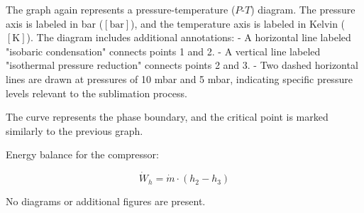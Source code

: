 The graph again represents a pressure-temperature (\(P\)-\(T\)) diagram. The pressure axis is labeled in bar (\([ \text{bar} ]\)), and the temperature axis is labeled in Kelvin (\([ \text{K} ]\)). The diagram includes additional annotations:  
- A horizontal line labeled "isobaric condensation" connects points 1 and 2.  
- A vertical line labeled "isothermal pressure reduction" connects points 2 and 3.  
- Two dashed horizontal lines are drawn at pressures of 10 mbar and 5 mbar, indicating specific pressure levels relevant to the sublimation process.  

The curve represents the phase boundary, and the critical point is marked similarly to the previous graph.

Energy balance for the compressor:  

\[
\dot{W}_h = \dot{m} \cdot (h_2 - h_3)
\]  

No diagrams or additional figures are present.